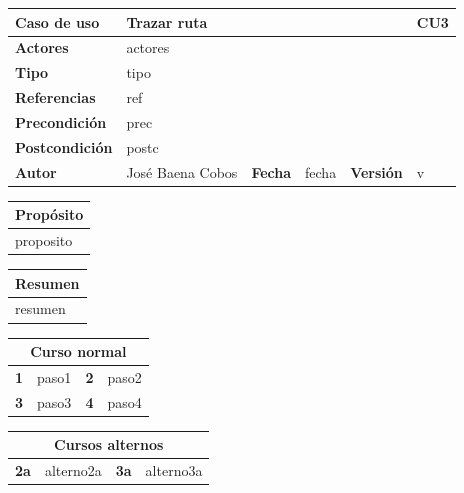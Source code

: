 \documentclass[12pt,spanish]{article}
\begin{document}
\begin{table}[H]
\centering
\begin{tabular}{|m{3cm}|m{4cm}|m{2cm}|m{2cm}|m{2cm}|m{1cm}|}
\hline
\textbf{Caso de uso} &  \multicolumn{4}{m{8cm}|}{Trazar ruta} \vline &  \cellcolor{gray!40}CU3 \\
\hline
\textbf{Actores} & \multicolumn{5}{m{8cm}|}{actores} \\
\hline
\textbf{Tipo} & \multicolumn{5}{m{8cm}|}{tipo} \\
\hline
\textbf{Referencias} &\multicolumn{5}{m{8cm}|}{ref} \\
\hline
\textbf{Precondición} & \multicolumn{5}{m{8cm}|}{prec} \\
\hline
\textbf{Postcondición} & \multicolumn{5}{m{8cm}|}{postc} \\
\hline
\textbf{Autor} & José Baena Cobos & \textbf{Fecha} & fecha & \textbf{Versión} & v \\
\hline
\end{tabular}

\vspace{1cm}

\begin{tabular}{|m{16.2cm}|}
\hline
\textbf{Propósito} \\
\hline
proposito \\
\hline
\end{tabular}

\vspace{1cm}

\begin{tabular}{|m{16.2cm}|}
\hline
\textbf{Resumen} \\
\hline
resumen \\
\hline
\end{tabular}

\vspace{1cm}

\begin{tabular}{|m{4pt}|m{7.33cm}|m{4pt}|m{7.33cm}|}
\hline
\multicolumn{4}{|c|}{\textbf{Curso normal}} \\
\hline
\textbf{1} & paso1 & \textbf{2} & paso2 \\
\hline
\textbf{3} & paso3 & \textbf{4} & paso4 \\
\hline
\end{tabular}

\vspace{1cm}

\begin{tabular}{|m{10pt}|m{7.15cm}|m{10pt}|m{7.15cm}|}
\hline
\multicolumn{4}{|c|}{\textbf{Cursos alternos}} \\
\hline
\textbf{2a} & alterno2a & \textbf{3a} & alterno3a  \\
\hline
\end{tabular}


\end{table}
\end{document}
